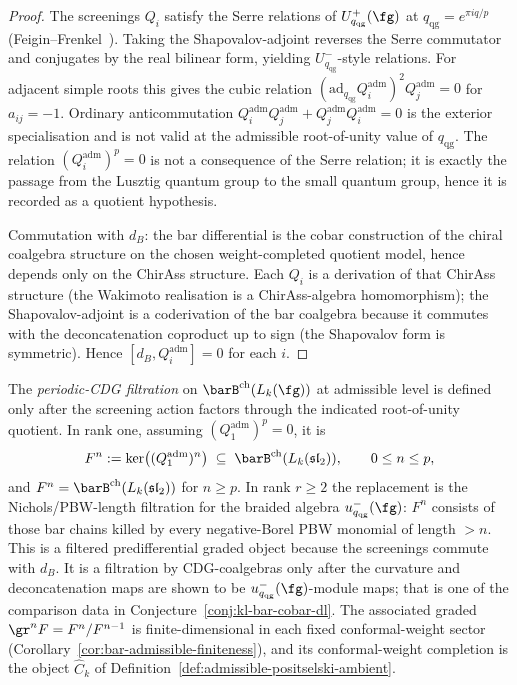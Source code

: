\begin{proof}
The screenings $Q_i$ satisfy the Serre relations of
$U_{q_{\mathrm{qg}}}^+(\fg)$ at $q_{\mathrm{qg}} = e^{\pi i q/p}$
\textup{(}Feigin--Frenkel~\cite{FF96}\textup{)}. Taking the
Shapovalov-adjoint reverses the Serre commutator and conjugates by
the real bilinear form, yielding $U_{q_{\mathrm{qg}}}^-$-style
relations.  For adjacent simple roots this gives the cubic relation
$(\mathrm{ad}_{q_{\mathrm{qg}}} Q_i^{\mathrm{adm}})^2
Q_j^{\mathrm{adm}} = 0$ for $a_{ij} = -1$.  Ordinary
anticommutation
$Q_i^{\mathrm{adm}} Q_j^{\mathrm{adm}} + Q_j^{\mathrm{adm}}
Q_i^{\mathrm{adm}} = 0$ is the exterior specialisation and is not
valid at the admissible root-of-unity value of $q_{\mathrm{qg}}$.
The relation $(Q_i^{\mathrm{adm}})^p=0$ is not a consequence of the
Serre relation; it is exactly the passage from the Lusztig quantum
group to the small quantum group, hence it is recorded as a quotient
hypothesis.

Commutation with $d_B$: the bar differential is the cobar
construction of the chiral coalgebra structure on the chosen
weight-completed quotient model, hence depends only on the ChirAss
structure.
Each $Q_i$ is a derivation of that ChirAss structure (the
Wakimoto realisation is a ChirAss-algebra homomorphism); the
Shapovalov-adjoint is a coderivation of the bar coalgebra
because it commutes with the deconcatenation coproduct up to sign
(the Shapovalov form is symmetric). Hence
$[d_B, Q_i^{\mathrm{adm}}] = 0$ for each $i$.
\end{proof}

\begin{definition}
\label{def:periodic-cdg-filtration}
The \emph{periodic-CDG filtration} on
$\barB^{\mathrm{ch}}(L_k(\fg))$ at admissible level is defined only
after the screening action factors through the indicated
root-of-unity quotient.  In rank one, assuming
$(Q_1^{\mathrm{adm}})^p=0$, it is
\begin{equation}\label{eq:periodic-filtration}
F^n := \ker\bigl((Q_1^{\mathrm{adm}})^n\bigr)
\;\subseteq\; \barB^{\mathrm{ch}}(L_k(\mathfrak{sl}_2)),
\qquad 0\leq n\leq p,
\end{equation}
and $F^n=\barB^{\mathrm{ch}}(L_k(\mathfrak{sl}_2))$ for $n\geq p$.
In rank $r\geq2$ the replacement is the Nichols/PBW-length
filtration for the braided algebra $u_{q_{\mathrm{qg}}}^-(\fg)$:
$F^n$ consists of those bar chains killed by every negative-Borel PBW
monomial of length $>n$.  This is a filtered predifferential graded
object because the screenings commute with $d_B$.  It is a filtration
by CDG-coalgebras only
after the curvature and deconcatenation maps are shown to be
$u_{q_{\mathrm{qg}}}^-(\fg)$-module maps; that is one of the comparison
data in Conjecture~\ref{conj:kl-bar-cobar-dl}.  The associated graded
$\gr^n F = F^n/F^{n-1}$ is finite-dimensional in each fixed
conformal-weight sector
\textup{(}Corollary~\textup{\ref{cor:bar-admissible-finiteness}}\textup{)},
and its conformal-weight completion is the object
$\widehat C_k$ of
Definition~\ref{def:admissible-positselski-ambient}.
\end{definition}

